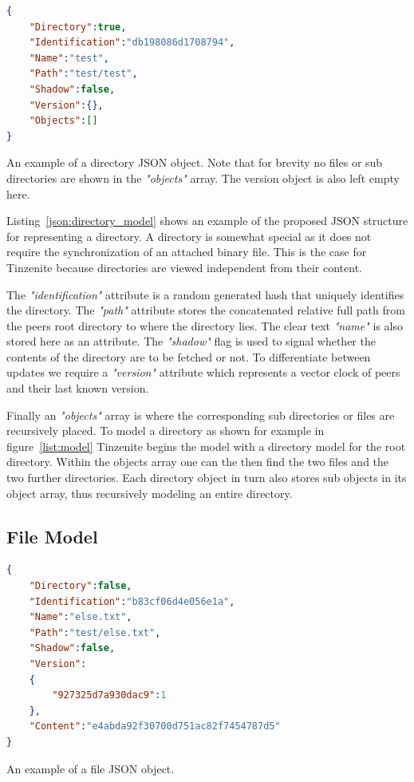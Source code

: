 \begin{listing}[htp]
    \begin{lstlisting}[language=json,firstnumber=0]
{
    "Directory":true,
    "Identification":"db198086d1708794",
    "Name":"test",
    "Path":"test/test",
    "Shadow":false,
    "Version":{},
    "Objects":[]
}
    \end{lstlisting}
\caption[Directory JSON Model]{An example of a directory JSON object. Note that for brevity no files or sub directories are shown in the \textit{"objects"} array. The version object is also left empty here.}
\label{json:directory_model}
\end{listing}

Listing~\ref{json:directory_model} shows an example of the proposed JSON structure for representing a directory.
A directory is somewhat special as it does not require the synchronization of an attached binary file.
This is the case for Tinzenite because directories are viewed independent from their content.

The \textit{"identification"} attribute is a random generated hash that uniquely identifies the directory.
The \textit{"path"} attribute stores the concatenated relative full path from the peers root directory to where the directory lies.
The clear text \textit{"name"} is also stored here as an attribute.
The \textit{"shadow"} flag is used to signal whether the contents of the directory are to be fetched or not.
To differentiate between updates we require a \textit{"version"} attribute which represents a vector clock of peers and their last known version.

Finally an \textit{"objects"} array is where the corresponding sub directories or files are recursively placed.
To model a directory as shown for example in figure~\ref{list:model} Tinzenite begins the model with a directory model for the root directory.
Within the objects array one can the then find the two files and the two further directories.
Each directory object in turn also stores sub objects in its object array, thus recursively modeling an entire directory.

\subsection{File Model}
\label{sec:file_model}

\begin{listing}[htp]
    \begin{lstlisting}[language=json,firstnumber=0]
{
    "Directory":false,
    "Identification":"b83cf06d4e056e1a",
    "Name":"else.txt",
    "Path":"test/else.txt",
    "Shadow":false,
    "Version":
    {
        "927325d7a930dac9":1
    },
    "Content":"e4abda92f30700d751ac82f7454787d5"
}
    \end{lstlisting}
\caption[File JSON Model]{An example of a file JSON object.}
\label{json:file_model}
\end{listing}

